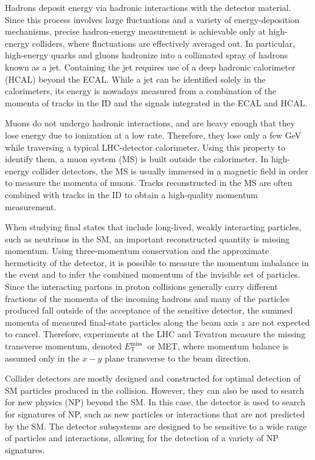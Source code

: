 Hadrons deposit energy via hadronic interactions with the detector material. Since this process involves large fluctuations and a variety of energy-deposition mechanisms, precise hadron-energy measurement is achievable only at high-energy colliders, where fluctuations are effectively averaged out. In particular, high-energy quarks and gluons hadronize into a collimated spray of hadrons known as a jet. Containing the jet requires use of a deep hadronic calorimeter (HCAL) beyond the ECAL. While a jet can be identified solely in the calorimeters, its energy is nowadays measured from a combination of the momenta of tracks in the ID and the signals integrated in the ECAL and HCAL.

Muons do not undergo hadronic interactions, and are heavy enough that they lose energy due to ionization at a low rate. Therefore, they lose only a few GeV while traversing a typical LHC-detector calorimeter. Using this property to identify them, a muon system (MS) is built outside the calorimeter. In high-energy collider detectors, the MS is usually immersed in a magnetic field in order to measure the momenta of muons. Tracks reconstructed in the MS are often combined with tracks in the ID to obtain a high-quality momentum measurement.

When studying final states that include long-lived, weakly interacting particles, such as neutrinos in the SM, an important reconstructed quantity is missing momentum. Using three-momentum conservation and the approximate hermeticity of the detector, it is possible to measure the momentum imbalance in the event and to infer the combined momentum of the invisible set of particles. Since the interacting partons in proton collisions generally carry different fractions of the momenta of the incoming hadrons and many of the particles produced fall outside of the acceptance of the sensitive detector, the summed momenta of measured final-state particles along the beam axis $z$ are not expected to cancel. Therefore, experiments at the LHC and Tevatron measure the missing transverse momentum, denoted $E_{\mathrm{T}}^{\text {miss }}$ or MET, where momentum balance is assumed only in the $x-y$ plane transverse to the beam direction.

Collider detectors are mostly designed and constructed for optimal detection of SM particles produced in the collision. However, they can also be used to search for new physics (NP) beyond the SM. In this case, the detector is used to search for signatures of NP, such as new particles or interactions that are not predicted by the SM. The detector subsystems are designed to be sensitive to a wide range of particles and interactions, allowing for the detection of a variety of NP signatures.

